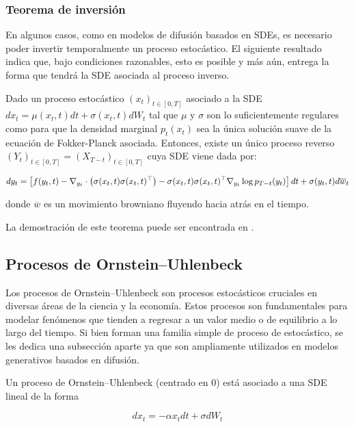 \subsubsection{Teorema de inversión}

En algunos casos, como en modelos de difusión basados en SDEs, es necesario poder invertir temporalmente un proceso estocástico. El siguiente resultado indica que, bajo condiciones razonables, esto es posible y más aún, entrega la forma que tendrá la SDE asociada al proceso inverso.

\begin{teo}
    \label{teo:anderson}
    Dado un proceso estocástico $(x_t)_{t\in[0,T]}$ asociado a la SDE $dx_t=\mu(x_t,t)dt+\sigma(x_t,t)dW_t$ tal que $\mu$ y $\sigma$ son lo suficientemente regulares como para que la densidad marginal $p_t(x_t)$ sea la única solución suave de la ecuación de Fokker-Planck asociada. Entonces, existe un único proceso reverso $(Y_t)_{t\in[0,T]}=(X_{T-t})_{t\in[0,T]}$ cuya SDE viene dada por:

    \begin{equation*}
        dy_t = \left[f(y_t,t) - \nabla_{y_t}\cdot\left(\sigma(x_t,t)\sigma(x_t,t)^\top\right) - \sigma(x_t,t)\sigma(x_t,t)^\top \nabla_{y_t} \log p_{T-t}(y_t)\right]dt + \sigma(y_t,t)d\overline{w}_t
    \end{equation*}

    donde $\overline{w}$ es un movimiento browniano fluyendo hacia atrás en el tiempo.
\end{teo}

La demostración de este teorema puede ser encontrada en \cite{anderson1982reverse}.

\subsection{Procesos de Ornstein–Uhlenbeck}

Los procesos de Ornstein–Uhlenbeck son procesos estocásticos cruciales en diversas áreas de la ciencia y la economía. Estos procesos son fundamentales para modelar fenómenos que tienden a regresar a un valor medio o de equilibrio a lo largo del tiempo. Si bien forman una familia simple de proceso de estocástico, se les dedica una subsección aparte ya que son ampliamente utilizados en modelos generativos basados en difusión.

Un proceso de Ornstein–Uhlenbeck (centrado en 0) está asociado a una SDE lineal de la forma

\begin{equation*}
    dx_t = -\alpha x_t dt + \sigma dW_t
\end{equation*}

